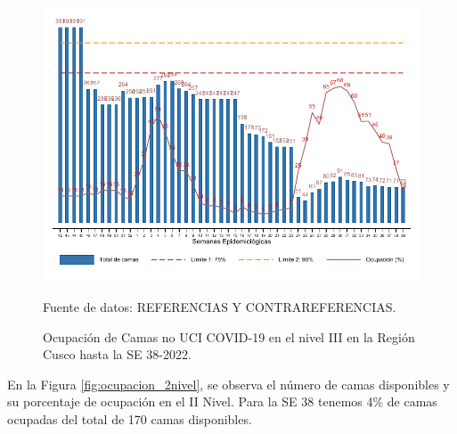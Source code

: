 \documentclass[12pt,a4paper,openany]{book}
\begin{document}
	\begin{figure}[htpb]
		\caption{Ocupación de Camas no UCI COVID-19 en el nivel III en la Región Cusco hasta la SE 38-2022.}\label{fig:ocupacion_3_nivel}
		\begin{center}
			\includegraphics[width=0.95\linewidth]{../figuras/nivel_3.pdf}
		\end{center}
		{\footnotesize {Fuente de datos: REFERENCIAS Y CONTRAREFERENCIAS.}}
	\end{figure}
	
	\clearpage
	
	En la Figura \ref{fig:ocupacion_2nivel}, se observa el número de camas disponibles y su porcentaje de ocupación en el II Nivel. Para la SE 38 tenemos 4$\%$ de camas ocupadas del total de 170 camas disponibles.
	
\end{document}
